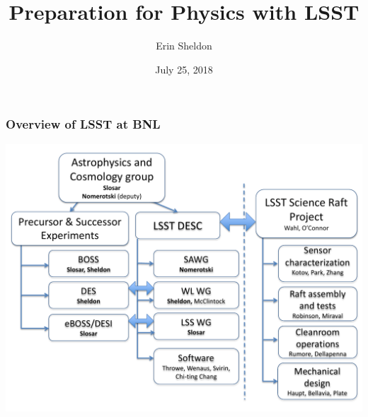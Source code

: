 \documentclass[aspectratio=169]{beamer}
\title{Preparation for Physics with LSST}
\author{Erin Sheldon}
\date{July 25, 2018}
\begin{document}
{
\maketitle
}



\begin{frame}
  \frametitle{Overview of LSST  at BNL}

  \begin{center}
    \includegraphics[height=0.8\textheight]{chart.pdf}
  \end{center}
\end{frame}

{
\frame
{
}
}
\end{document}
